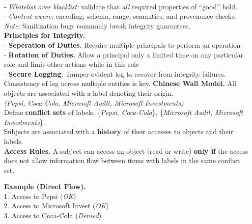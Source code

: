 \documentclass[main.tex]{subfiles}
\begin{document}
\begin{minipage}[t]{0.495\textwidth}
	\\
	- \textit{Whitelist over blacklist:} validate that \emph{all} required properties of “good” hold.\\
	- \textit{Context-aware:} encoding, schema, range, semantics, and provenance checks.\\
	\textit{Note:} Sanitization bugs commonly break integrity guarantees.\\
	\textbf{Principles for Integrity.}\\
	- \textbf{Seperation of Duties.} Require multiple principals to perform an operation\\
	- \textbf{Rotation of Duties.} Allow a principal only a limited time on any particular role and limit other actions while in this role\\
	- \textbf{Secure Logging.} Tamper evident log to recover from integrity failures. Consistency of log across multiple entities is key.
	\hline
	\textbf{Chinese Wall Model.} All objects are associated with a label denoting their origin.\\
	\textit{(Pepsi, Coca-Cola, Microsoft Audit, Microsoft Investments)}\\
	Define \textbf{conflict sets} of labels.
	\{\textit{Pepsi, Coca-Cola}\}, \{\textit{Microsoft Audit, Microsoft Investments}\}.\\
	Subjects are associated with a \textbf{history} of their accesses to objects and their labels.\\
	\textbf{Access Rules.} A subject can access an object (read or write) \textbf{only if} the access does not allow information flow between items with labels in the same conflict set.\\
	\begin{minipage}[t]{0.38\textwidth}
		\textbf{Example (Direct Flow).}\\
		1. Access to Pepsi (\textit{OK})\\
		2. Access to Microsoft Invest (\textit{OK})\\
		3. Access to Coca-Cola (\textit{Denied})
	\end{minipage}

\end{minipage}
\end{document}
